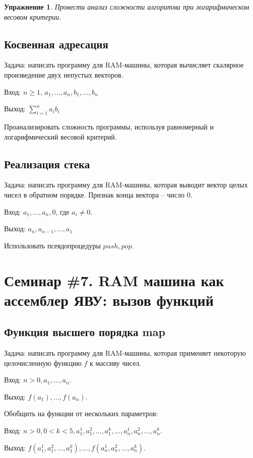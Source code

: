 \documentclass[a4paper, 12pt]{extarticle}
\newtheorem*{homework}{Упражнение}
\begin{document}
\begin{homework}
 Провести анализ сложности алгоритма при логарифмическом весовом критерии.
\end{homework}

\subsection*{Косвенная адресация}
Задача: написать программу для RAM-машины, которая вычисляет скалярное произведение двух непустых векторов.

Вход: $n \geq 1$, $a_1, ..., a_n, b_1, ..., b_n$

Выход: $\sum_{i=1}^{n} a_i b_i$

Проанализировать сложность программы, используя равномерный и логарифмический весовой критерий.

\subsection*{Реализация стека}
Задача: написать программу для RAM-машины, которая выводит вектор целых чисел в обратном порядке. Признак конца вектора -- число $0$.

Вход: $a_1, ..., a_n, 0$, где $a_i \neq 0$.

Выход: $a_n, a_{n-1}, ..., a_1$

Использовать псевдопроцедуры $push, pop$.

\newpage
\section*{Семинар \#7. RAM машина как ассемблер ЯВУ: вызов функций}

\subsection*{Функция высшего порядка map}
Задача: написать программу для RAM-машины, которая применяет некоторую целочисленную функцию $f$ к массиву чисел.

Вход: $n > 0, a_1, ..., a_n$.

Выход: $f(a_1), ..., f(a_n)$.

\noindent Обобщить на функции от нескольких параметров:

Вход: $n > 0, 0 < k < 5, a_1^1, a_1^2, ..., a_1^k, ..., a_n^1, a_n^2, ..., a_n^k$.

Выход: $f(a_1^1, a_1^2, ..., a_1^k), ..., f(a_n^1, a_n^2, ..., a_n^k)$.
\end{document}
